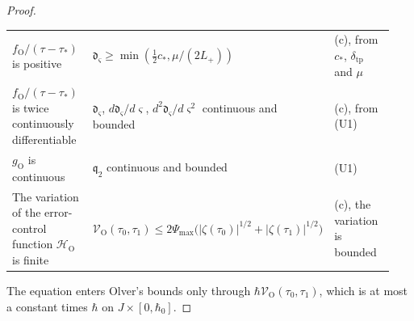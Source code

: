 \documentclass[aps,prd,onecolumn,tightenlines,nofootinbib,notitlepage,11pt,floatfix]{revtex4-2}
\theoremstyle{indentedtheorem}
\begin{document}
\begin{proof}
\begin{center}
\begin{tabular}{p{0.30\linewidth}p{0.34\linewidth}p{0.30\linewidth}}
$f_\text{O}/(\tau-\tau_*)$ is positive & $\mathfrak{d}_\varsigma\geq\min(\tfrac{1}{2}c_*,\mu/(2L_+))$ & (c), from $c_*$, $\delta_\text{tp}$ and $\mu$ \\
$f_\text{O}/(\tau-\tau_*)$ is twice continuously differentiable & $\mathfrak{d}_\varsigma$, $d\mathfrak{d}_\varsigma/d\varsigma$, $d^2\mathfrak{d}_\varsigma/d\varsigma^2$ continuous and bounded & (c), from (U1) \\
$g_\text{O}$ is continuous & $\mathfrak{q}_2$ continuous and bounded & (U1) \\
The variation of the error-control function $\mathcal{H}_\text{O}$ is finite & $\mathcal{V}_\text{O}(\tau_0,\tau_1)\leq2\Psi_\text{max}\big(|\zeta(\tau_0)|^{1/2}+|\zeta(\tau_1)|^{1/2}\big)$ & (c), the variation is bounded \\
\hline
\end{tabular}
\end{center}
The equation enters Olver's bounds only through $\hbar\mathcal{V}_\text{O}(\tau_0,\tau_1)$, which is at most a constant times $\hbar$ on $J\times[0,\hbar_0]$.


\end{proof}
\end{document}
